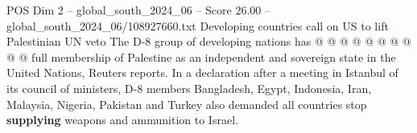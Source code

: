 \begin{textsample}{POS Dim 2 – global\_south\_2024\_06 – Score 26.00 – global\_south\_2024\_06/108927660.txt}
Developing countries call on US to lift Palestinian UN veto The D-8 group of developing nations has @ @ @ @ @ @ @ @ @ @ full membership of Palestine as an independent and sovereign state in the United Nations, Reuters reports.
In a declaration after a meeting in Istanbul of its council of ministers, D-8 members Bangladesh, Egypt, Indonesia, Iran, Malaysia, Nigeria, Pakistan and Turkey also demanded all countries stop \textbf{supplying} weapons and ammunition to Israel.

\end{textsample}
